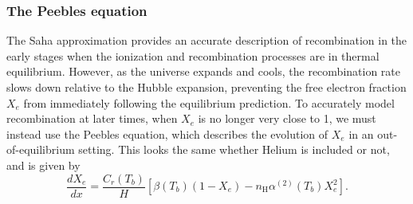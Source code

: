 \documentclass{aa}
\numberwithin{equation}{section}
\numberwithin{table}{section}
\numberwithin{figure}{section}
\begin{document}
\subsubsection{The Peebles equation}
The Saha approximation provides an accurate description of recombination in the early stages when the ionization and recombination processes are in thermal equilibrium. However, as the universe expands and cools, the recombination rate slows down relative to the Hubble expansion, preventing the free electron fraction $X_e$ from immediately following the equilibrium prediction. To accurately model recombination at later times, when $X_e$ is no longer very close to 1, we must instead use the Peebles equation, which describes the evolution of $X_e$ in an out-of-equilibrium setting. This looks the same whether Helium is included or not, and is given by
\begin{equation}
\frac{dX_e}{dx} = \frac{C_r(T_b)}{H} \left[ \beta(T_b) (1 - X_e) - n_\text{H}\alpha^{(2)}(T_b) X_e^2 \right]. \label{eq: Peebles}
\end{equation}
\end{document}
